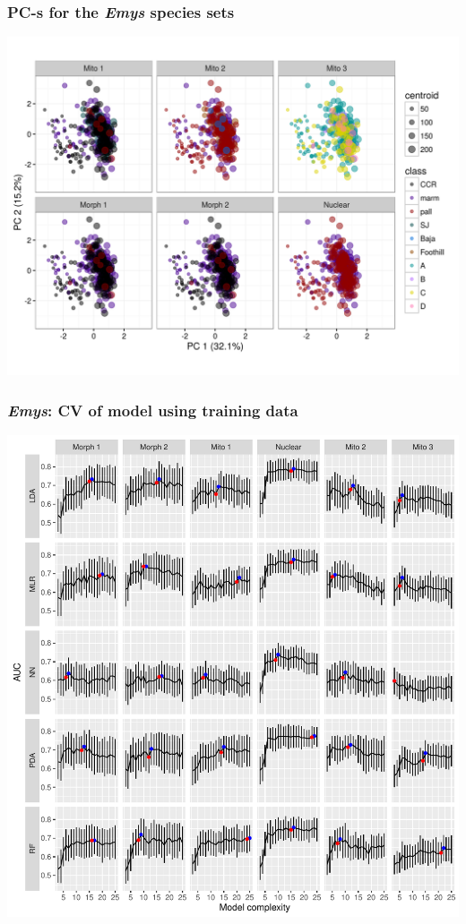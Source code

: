 \documentclass{beamer}
\begin{document}
\begin{frame}
  \frametitle{PC-s for the \textit{Emys} species sets}
  \begin{center}
    \includegraphics[width=\textwidth,height=0.8\textheight,keepaspectratio=true]{figure/emys_pc_graph}
  \end{center}
\end{frame}

\begin{frame}
  \frametitle{\textit{Emys}: CV of model using training data}
  \begin{center}
    \includegraphics[width=\textwidth,height=0.8\textheight,keepaspectratio=true]{figure/emys_model_sel}
  \end{center}
\end{frame}
\end{document}
